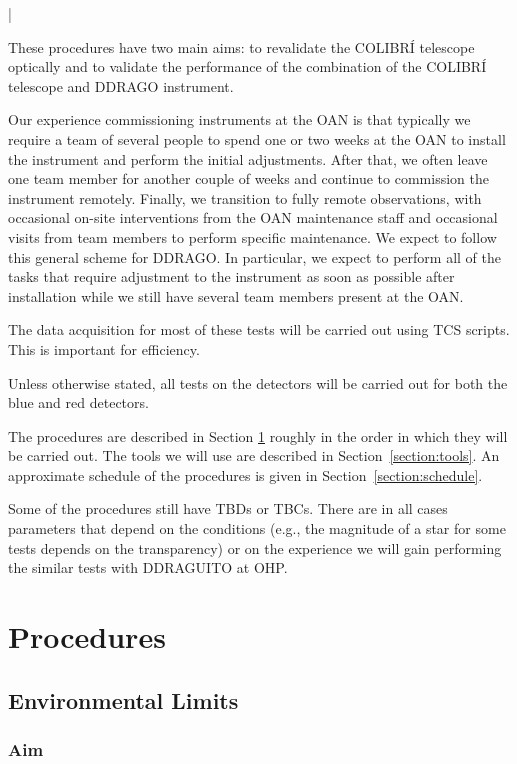|\documentclass{article}
\begin{document}
These procedures have two main aims: to revalidate the COLIBRÍ telescope optically and to validate the performance of the combination of the COLIBRÍ telescope and DDRAGO instrument.

Our experience commissioning instruments at the OAN is that typically we require a team of several people to spend one or two weeks at the OAN to install the instrument and perform the initial adjustments. After that, we often leave one team member for another couple of weeks and continue to commission the instrument remotely. Finally, we transition to fully remote observations, with occasional on-site interventions from the OAN maintenance staff and occasional visits from team members to perform specific maintenance. We expect to follow this general scheme for DDRAGO. In particular, we expect to perform all of the tasks that require adjustment to the instrument as soon as possible after installation while we still have several team members present at the OAN.

The data acquisition for most of these tests will be carried out using TCS scripts. This is important for efficiency.

Unless otherwise stated, all tests on the detectors will be carried out for both the blue and red detectors.

The procedures are described in Section \ref{section:procedures} roughly in the order in which they will be carried out. The tools we will use are described in Section~\ref{section:tools}. An approximate schedule of the procedures is given in Section~\ref{section:schedule}.

Some of the procedures still have TBDs or TBCs. There are in all cases parameters that depend on the conditions (e.g., the magnitude of a star for some tests depends on the transparency) or on the experience we will gain performing the similar tests with DDRAGUITO at OHP.

\section{Procedures}
\label{section:procedures}


\subsection{Environmental Limits}

\subsubsection{Aim}
\end{document}
